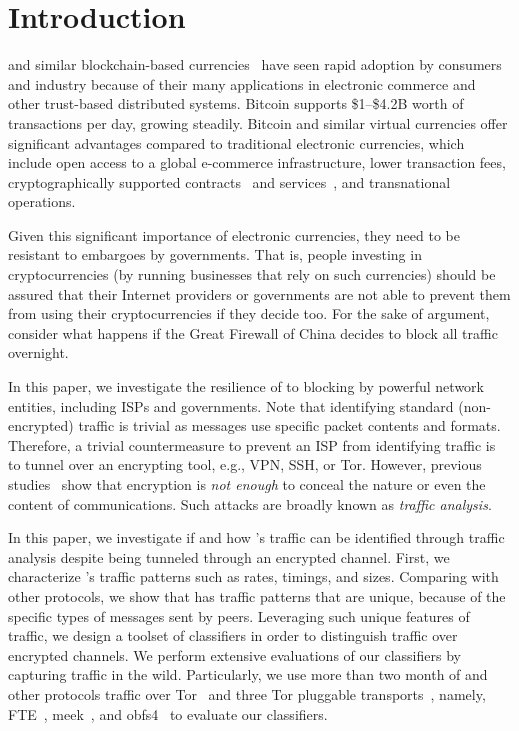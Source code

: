 
\section{Introduction}

\bc and similar blockchain-based currencies~\cite{bc-design} have  
seen rapid adoption by consumers and industry because of their many applications in
electronic commerce and other trust-based distributed systems. 
Bitcoin
supports \$1--\$4.2B worth of transactions per day, growing
steadily. Bitcoin and similar virtual
currencies offer significant advantages compared to
traditional electronic currencies, which include
open access to a global e-commerce infrastructure,
lower transaction fees, cryptographically supported
contracts~\cite{Andrychowicz:2014} and services~\cite{Miller:2014},
and transnational operations.

Given this significant importance of electronic currencies,
they need to be resistant to embargoes by governments.  
That is, people investing in cryptocurrencies (by running businesses that rely on such currencies) 
should be assured that their Internet providers or governments are not able to prevent them from 
using their cryptocurrencies if they decide too.
For the sake of argument, consider what happens if the Great Firewall of China
decides to block all \bc traffic overnight.%


In this paper, we investigate the resilience of \bc to blocking by powerful network 
entities, including  ISPs and governments. 
Note that identifying standard (non-encrypted) \bc traffic is trivial 
as \bc messages use specific packet contents and formats.
Therefore, a trivial countermeasure to prevent an ISP from identifying \bc traffic is to 
tunnel \bc over an encrypting tool, e.g., VPN, SSH, or Tor. 
However, previous studies~\cite{wright2007language,herrmann2009website,fing-attacks-defenses} show that encryption is \emph{not enough} to conceal the
nature or even the content of communications.  Such attacks are broadly known as \emph{traffic analysis}.


In this paper, we investigate if and how  \bc's traffic can be identified through traffic analysis despite being tunneled through an encrypted channel. 
First, we characterize \bc's traffic patterns such as rates, timings, and sizes. 
Comparing with other protocols, we show that \bc has traffic patterns that are unique, because of the specific types of messages sent by \bc peers. 
Leveraging such unique features of \bc traffic, we design a toolset of classifiers in order to distinguish \bc traffic over encrypted channels. 
We perform extensive evaluations of our classifiers by capturing \bc traffic in the wild. Particularly, we use more than two month of \bc  and other protocols traffic over Tor~\cite{tor} and three Tor pluggable transports~\cite{pluggable-transport}, namely, FTE~\cite{fte}, meek~\cite{meek}, and obfs4~\cite{obfsproxy} to evaluate our classifiers.%

